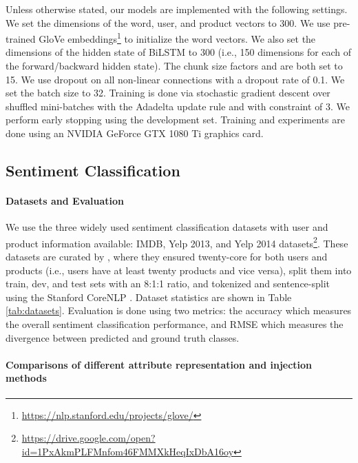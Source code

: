 \documentclass[11pt,a4paper]{article}
\begin{document}
Unless otherwise stated, our models are implemented with the following settings. We set the dimensions of the word, user, and product vectors to 300. We use pre-trained GloVe embeddings\footnote{\url{https://nlp.stanford.edu/projects/glove/}} 
\cite{pennington2014glove} to initialize the word vectors. We also set the dimensions of the hidden state of BiLSTM to 300 (i.e., 150 dimensions for each of the forward/backward hidden state). The chunk size factors  and  are both set to 15. We use dropout \cite{srivastava2014dropout} on all non-linear connections with a dropout rate of 0.1. We set the batch size to 32. Training is done via stochastic gradient descent over shuffled mini-batches with the Adadelta update rule \cite{zeiler2012adadelta} and with  constraint \cite{hinton2012improving} of 3. We perform early stopping using the development set. Training and experiments are done using an NVIDIA GeForce GTX 1080 Ti graphics card.

\subsection{Sentiment Classification}

\paragraph{Datasets and Evaluation}

We use the three widely used sentiment classification datasets with user and product information available: IMDB, Yelp 2013, and Yelp 2014 datasets\footnote{\url{https://drive.google.com/open?id=1PxAkmPLFMnfom46FMMXkHeqIxDbA16oy}}. These datasets are curated by \citet{tang2015learning}, where they ensured twenty-core for both users and products (i.e., users have at least twenty products and vice versa), split them into train, dev, and test sets with an 8:1:1 ratio, and tokenized and sentence-split using the Stanford CoreNLP \cite{manning2014stanford}. 
Dataset statistics are shown in Table \ref{tab:datasets}.
Evaluation is done using two metrics: the accuracy which measures the overall sentiment classification performance, and RMSE which measures the divergence between predicted and ground truth classes.

\paragraph{Comparisons of different attribute representation and injection methods}
\end{document}

